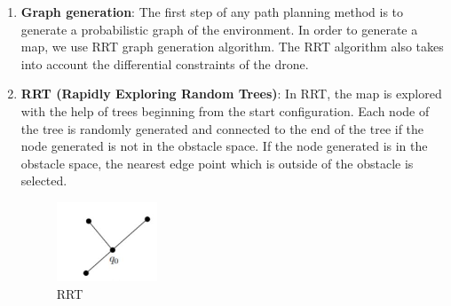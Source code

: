 \documentclass{IEEEtran}
\begin{document}
\begin{enumerate}
\item  \textbf{Graph generation}: The first step of any path planning method is to generate a probabilistic graph of the environment. In order to generate a map, we use RRT graph generation algorithm. The RRT algorithm also takes into account the differential constraints of the drone.\\

\item \textbf{RRT (Rapidly Exploring Random Trees)}: In RRT, the map is explored with the help of trees beginning from the start configuration. Each node of the tree is randomly generated and connected to the end of the tree if the node generated is not in the obstacle space. If the node generated is in the obstacle space, the nearest edge point which is outside of the obstacle is selected.
\begin{figure}[h]
    \centering
    \includegraphics[width=3cm]{RRT1}
    \caption{RRT}
    \label{fig:RRT}
\end{figure}


\end{enumerate}
\end{document}
